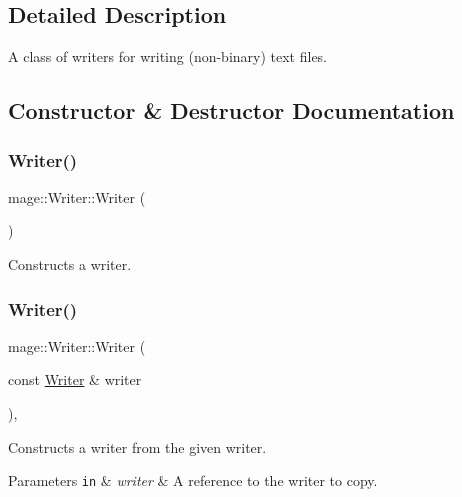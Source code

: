 \subsection{Detailed Description}
A class of writers for writing (non-\/binary) text files. 

\subsection{Constructor \& Destructor Documentation}
\hypertarget{classmage_1_1_writer_a40b6cd3005d509e670c5a49272d9ef27}{}\label{classmage_1_1_writer_a40b6cd3005d509e670c5a49272d9ef27} 
\subsubsection{\texorpdfstring{Writer()}{Writer()}\hspace{0.1cm}{\footnotesize\ttfamily [1/3]}}
{\footnotesize\ttfamily mage\+::\+Writer\+::\+Writer (\begin{DoxyParamCaption}{ }\end{DoxyParamCaption})\hspace{0.3cm}{\ttfamily [protected]}}

Constructs a writer. \hypertarget{classmage_1_1_writer_a2b257938508732ca0b78241aafa7922c}{}\label{classmage_1_1_writer_a2b257938508732ca0b78241aafa7922c} 
\subsubsection{\texorpdfstring{Writer()}{Writer()}\hspace{0.1cm}{\footnotesize\ttfamily [2/3]}}
{\footnotesize\ttfamily mage\+::\+Writer\+::\+Writer (\begin{DoxyParamCaption}\item[{const \hyperlink{classmage_1_1_writer}{Writer} \&}]{writer }\end{DoxyParamCaption})\hspace{0.3cm}{\ttfamily [protected]}, {\ttfamily [delete]}}

Constructs a writer from the given writer.


\begin{DoxyParams}[1]{Parameters}
\mbox{\tt in}  & {\em writer} & A reference to the writer to copy. \\
\hline
\end{DoxyParams}
\hypertarget{classmage_1_1_writer_abda6f6db577201580c0e97c0816e0d3f}{}\label{classmage_1_1_writer_abda6f6db577201580c0e97c0816e0d3f} 
